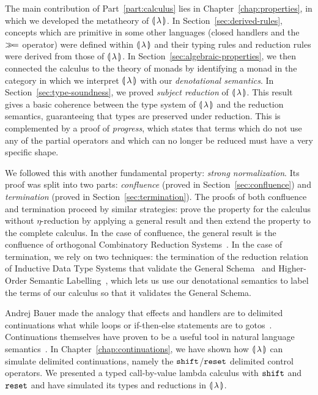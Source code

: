 The main contribution of Part~\ref{part:calculus} lies in
Chapter~\ref{chap:properties}, in which we developed the metatheory of
${\llparenthesis \, \lambda \, \rrparenthesis}$. In Section~\ref{sec:derived-rules}, concepts which are primitive
in some other languages (closed handlers and the $\mathbin{\gg\!=}$ operator) were
defined within ${\llparenthesis \, \lambda \, \rrparenthesis}$ and their typing rules and reduction rules were
derived from those of ${\llparenthesis \, \lambda \, \rrparenthesis}$. In Section~\ref{sec:algebraic-properties},
we then connected the calculus to the theory of monads by identifying a
monad in the category in which we interpret ${\llparenthesis \, \lambda \, \rrparenthesis}$ with our
\emph{denotational semantics}. In Section~\ref{sec:type-soundness}, we
proved \emph{subject reduction} of ${\llparenthesis \, \lambda \, \rrparenthesis}$. This result gives a basic
coherence between the type system of ${\llparenthesis \, \lambda \, \rrparenthesis}$ and the reduction semantics,
guaranteeing that types are preserved under reduction.  This is
complemented by a proof of \emph{progress}, which states that terms which
do not use any of the partial operators and which can no longer be reduced
must have a very specific shape.

We followed this with another fundamental property: \emph{strong
  normalization}. Its proof was split into two parts: \emph{confluence}
(proved in Section~\ref{sec:confluence}) and \emph{termination} (proved in
Section~\ref{sec:termination}). The proofs of both confluence and
termination proceed by similar strategies: prove the property for the
calculus without $\eta$-reduction by applying a general result and then
extend the property to the complete calculus. In the case of confluence,
the general result is the confluence of orthogonal Combinatory Reduction
Systems~\cite{klop1993combinatory}. In the case of termination, we rely on
two techniques: the termination of the reduction relation of Inductive Data
Type Systems that validate the General Schema~\cite{blanqui2000termination}
and Higher-Order Semantic Labelling~\cite{hamana2007higher}, which lets us
use our denotational semantics to label the terms of our calculus so that
it validates the General Schema.

Andrej Bauer made the analogy that effects and handlers are to delimited
continuations what while loops or if-then-else statements are to
gotos~\cite{bauer2012lambda}. Continuations themselves have proven to be a
useful tool in natural language
semantics~\cite{de2001type,barker2002continuations,shan2005linguistic,de2006towards,barker2006continuations,barker2014continuations}. In
Chapter~\ref{chap:continuations}, we have shown how ${\llparenthesis \, \lambda \, \rrparenthesis}$ can simulate
delimited continuations, namely the $\mathtt{shift}$/$\mathtt{reset}$ delimited control
operators. We presented a typed call-by-value lambda calculus with $\mathtt{shift}$
and $\mathtt{reset}$ and have simulated its types and reductions in ${\llparenthesis \, \lambda \, \rrparenthesis}$.

